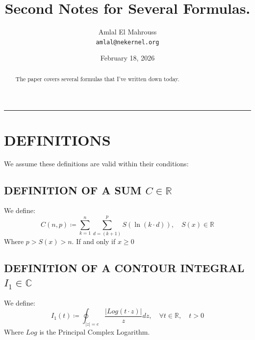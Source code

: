 \documentclass[11pt, a4paper]{article}
\title{Second Notes for Several Formulas.}
\author{Amlal El Mahrouss\\\texttt{amlal@nekernel.org}}
\date{February 18, 2026}
\begin{document}
\maketitle

\begin{center}
	\rule[0.01cm]{17cm}{0.01cm}
\end{center}

\begin{abstract}
\begin{center}
    The paper covers several formulas that I've written down today.
\end{center}
\end{abstract}

\section{DEFINITIONS}

We assume these definitions are valid within their conditions:

\subsection{DEFINITION OF A SUM $C \in \mathbb{R}$}
We define:
\begin{equation}
C(n, p) \coloneq \sum_{k=1}^{n} \sum_{d=(k+1)}^{p} S(\ln (k \cdot d)), \quad S(x) \in \mathbb{R}
\end{equation}
Where $p > S(x) > n$. If and only if $x \geq 0$ 

\subsection{DEFINITION OF A CONTOUR INTEGRAL $I_{1} \in \mathbb{C}$}
We define:
\begin{equation}
I_{1}(t) \coloneq \oint_{|z|=e} \frac{|Log(t\cdot z)|}{z}dz, \quad \forall t \in \mathbb{R}, \quad t > 0
\end{equation}
Where $Log$ is the Principal Complex Logarithm.
\end{document}
